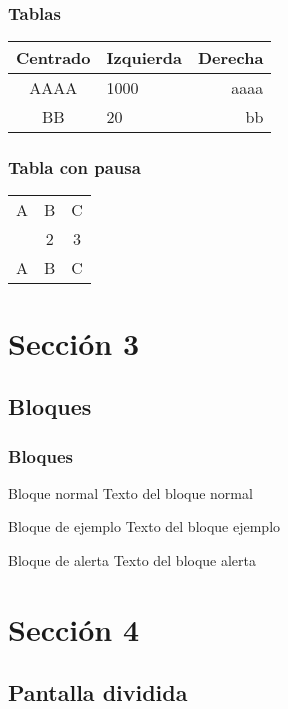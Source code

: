 \documentclass{beamer}
\begin{document}
\begin{frame}
\frametitle{Tablas}
\begin{tabular}{|c|l|r|} \hline
\textbf{Centrado} & \textbf{Izquierda} & \textbf{Derecha} \\ \hline
AAAA  & 1000 & aaaa \\ \hline
BB    & 20   & bb \\ \hline
\end{tabular}
\end{frame}

\begin{frame}
\frametitle{Tabla con pausa}
\begin{tabular}{c c c}
A & B & C \\ \pause 
1 & 2 & 3 \\  \pause 
A & B & C \\ 
\end{tabular} 
\end{frame}

\section{Sección 3}
\subsection{Bloques}

\begin{frame}
\frametitle{Bloques}

\begin{block}{Bloque normal}
Texto del bloque normal
\end{block}

\begin{exampleblock}{Bloque de ejemplo}
Texto del bloque ejemplo
\end{exampleblock}

\begin{alertblock}{Bloque de alerta}
Texto del bloque alerta
\end{alertblock}
\end{frame}

\section{Sección 4}
\subsection{Pantalla dividida}
\end{document}
